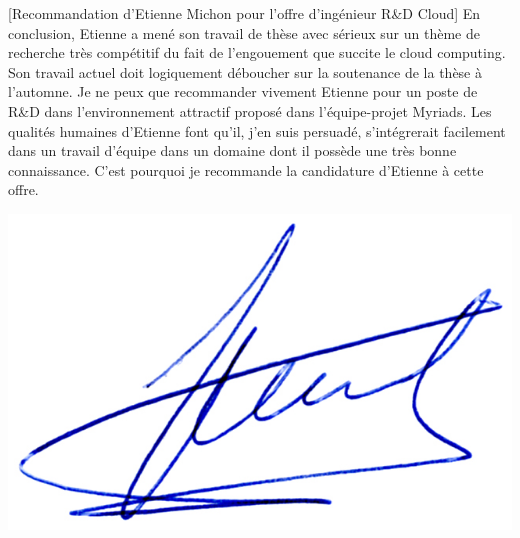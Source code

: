 \documentclass[a4paper,10pt]{article}
\begin{document}
\begin{letter}[Recommandation d'Etienne Michon pour l'offre d'ingénieur R\&D Cloud]
\vspace{1cm}
En conclusion, Etienne a mené son travail  de thèse avec sérieux sur un thème de
recherche  très  compétitif  du  fait  de  l'engouement  que  succite  le  cloud
computing. Son travail actuel doit logiquement déboucher sur la soutenance de la
thèse à l'automne. Je ne peux que  recommander vivement Etienne pour un poste de
R\&D dans  l'environnement attractif  proposé dans l'équipe-projet  Myriads.  Les
qualités  humaines  d'Etienne  font  qu'il, j'en  suis  persuadé,  s'intégrerait
facilement dans  un travail d'équipe  dans un domaine  dont il possède  une très
bonne connaissance. C'est pourquoi je recommande la candidature d'Etienne à cette
offre.

\end{letter}
\begin{flushright}
\includegraphics[width=.25\textwidth]{signgenaud.jpg}
\end{flushright}
\end{document}
